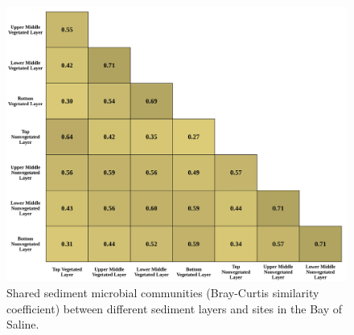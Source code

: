 \documentclass[12pt,]{article}
\begin{document}
\begin{figure}[H]

{\centering \includegraphics[width=1\linewidth,height=1\textheight]{../results/figures/matrix} 

}

\caption{Shared sediment microbial communities (Bray-Curtis similarity coefficient) between different sediment layers and sites in the Bay of Saline.\label{matrix}}\label{fig:unnamed-chunk-5}
\end{figure}
\end{document}
